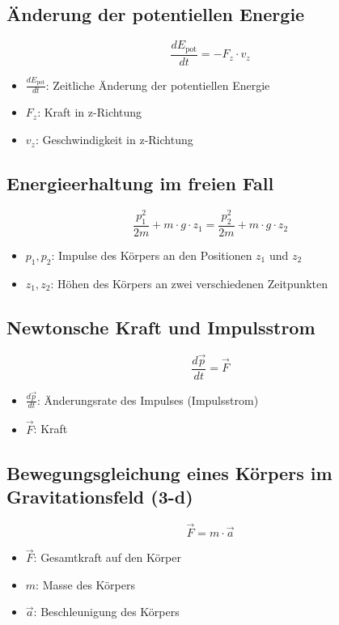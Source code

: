 \documentclass[a4paper, 8pt]{extarticle}
\begin{document}
\begin{landscape}
\begin{multicols*}{3}
\subsection{Änderung der potentiellen Energie}
\[
\frac{dE_{\text{pot}}}{dt} = -F_z \cdot v_z
\]
{\footnotesize
\begin{itemize}
    \item \( \frac{dE_{\text{pot}}}{dt} \): Zeitliche Änderung der potentiellen Energie
    \item \( F_z \): Kraft in z-Richtung
    \item \( v_z \): Geschwindigkeit in z-Richtung
\end{itemize}
}

\subsection{Energieerhaltung im freien Fall}
\[
\frac{p_1^2}{2m} + m \cdot g \cdot z_1 = \frac{p_2^2}{2m} + m \cdot g \cdot z_2
\]
{\footnotesize
\begin{itemize}
    \item \( p_1, p_2 \): Impulse des Körpers an den Positionen \( z_1 \) und \( z_2 \)
    \item \( z_1, z_2 \): Höhen des Körpers an zwei verschiedenen Zeitpunkten
\end{itemize}
}

\subsection{Newtonsche Kraft und Impulsstrom}
\[
\frac{d\vec{p}}{dt} = \vec{F}
\]
{\footnotesize
\begin{itemize}
    \item \( \frac{d\vec{p}}{dt} \): Änderungsrate des Impulses (Impulsstrom)
    \item \( \vec{F} \): Kraft
\end{itemize}
}

\subsection{Bewegungsgleichung eines Körpers im Gravitationsfeld (3-d)}
\[
\vec{F} = m \cdot \vec{a}
\]
{\footnotesize
\begin{itemize}
    \item \( \vec{F} \): Gesamtkraft auf den Körper
    \item \( m \): Masse des Körpers
    \item \( \vec{a} \): Beschleunigung des Körpers
\end{itemize}
}

\end{multicols*}
\end{landscape}
\end{document}
